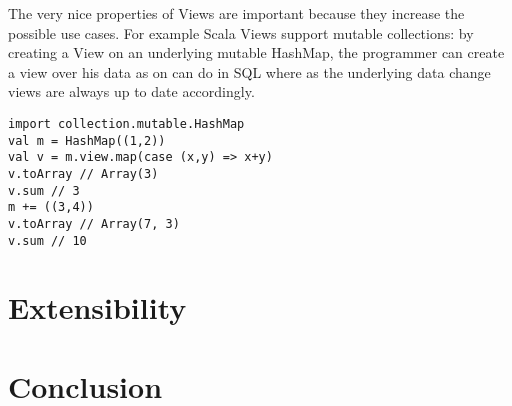 \documentclass[a4paper,12pt,twocolumn]{article}
\begin{document}
The very nice properties of Views are important because they increase the possible use cases.
For example Scala Views support mutable collections: by creating a View on an underlying mutable HashMap, the programmer can create a view over his data as on can do in SQL where as the underlying data change views are always up to date accordingly.

\begin{lstlisting}
import collection.mutable.HashMap
val m = HashMap((1,2))
val v = m.view.map(case (x,y) => x+y)
v.toArray // Array(3)
v.sum // 3
m += ((3,4))
v.toArray // Array(7, 3)
v.sum // 10
\end{lstlisting}

\section{Extensibility}
\label{sec:ext}
\lipsum[6]

\section{Conclusion}
\lipsum[7]

{}

\end{document}
